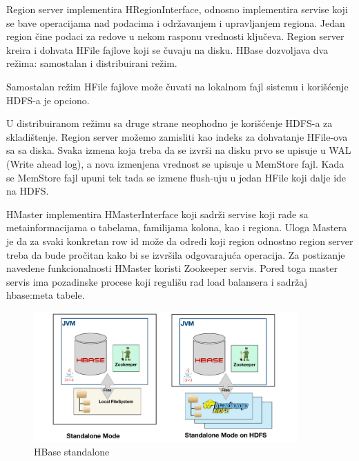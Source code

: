 \documentclass[12pt,oneside]{memoir}
\begin{document}
Region server implementira HRegionInterface, odnosno implementira servise koji se bave operacijama nad podacima i održavanjem i upravljanjem regiona. Jedan region čine podaci za redove u nekom rasponu vrednosti ključeva. Region server kreira i dohvata HFile fajlove koji se čuvaju na disku. HBase dozvoljava dva režima: samostalan i distribuirani režim.

Samostalan režim HFile fajlove može čuvati na lokalnom fajl sistemu i korišćenje HDFS-a je opciono.

U distribuiranom režimu sa druge strane neophodno je korišćenje HDFS-a za skladištenje. Region server možemo zamisliti kao indeks za dohvatanje HFile-ova sa sa diska.  Svaka izmena koja treba da se izvrši na disku prvo se upisuje u WAL (Write ahead log), a nova izmenjena vrednost se upisuje u MemStore fajl. Kada se MemStore fajl upuni tek tada se izmene flush-uju u jedan HFile koji dalje ide na HDFS. 

HMaster implementira HMasterInterface koji sadrži servise koji rade sa metainformacijama o tabelama, familijama kolona, kao i regiona. Uloga Mastera je da za svaki konkretan row id može da odredi koji region odnostno region server treba da bude pročitan kako bi se izvršila odgovarajuća operacija. Za postizanje navedene funkcionalnosti HMaster koristi Zookeeper \cite{BigTable} servis. Pored toga master servis ima pozadinske procese koji regulišu rad load balansera i sadržaj hbase:meta tabele.

\begin{figure}[!ht]
  \centering
  \includegraphics[width=0.9\textwidth]{hbase-standalone.png}
  \caption{HBase standalone}
  \label{fig:grafikon}
\end{figure}
\end{document}
